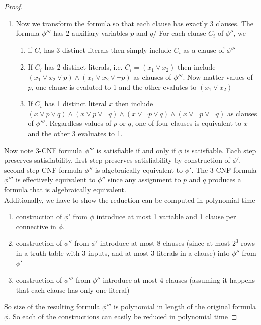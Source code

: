 \documentclass[11pt]{article}
\begin{document}
\begin{theorem*}
\begin{enumerate}
\begin{proof}
\begin{enumerate}
                \item Now we transform the formula so that each clause has exactly 3 clauses. The formula $\phi'''$ has 2 auxiliary variables $p$ and $q$/ For each cluase $C_i$ of $\phi''$, we 
                \begin{enumerate}
                    \item if $C_i$ has 3 distinct literals then simply include $C_i$ as a clause of $\phi'''$
                    \item If $C_i$ has 2 distinct literals, i.e. $C_i = (x_1 \lor x_2)$ then include $(x_1 \lor x_2 \lor p) \land (x_1\lor x_2 \lor \neg p)$ as clauses of $\phi'''$. Now matter values of $p$, one clause is evaluted to 1 and the other evalutes to $(x_1 \lor x_2)$
                    \item If $C_i$ has 1 distinct literal $x$ then include $(x \lor p \lor q) \land (x \lor p \lor \neg q) \land (x \lor \neg p \lor q ) \land (x\lor \neg p \lor \neg q)$ as clauses of $\phi'''$. Regardless values of $p$ or $q$, one of four clauses is equivalent to $x$ and the other 3 evaluates to 1.
                \end{enumerate}
            \end{enumerate}
            Now note 3-CNF formula $\phi'''$ is satisfiable if and only if $\phi$ is satisfiable. Each step preserves satisfiability. first step preserves satisfiability by construction of $\phi'$. second step CNF formula $\phi''$ is algebraically equivalent to $\phi'$. The 3-CNF formula $\phi'''$ is effectively equivalent to $\phi''$ since any assignment to $p$ and $q$ produces a formula that is algebraically equivalent.\\
            Additionally, we have to show the reduction can be computed in polynomial time 
            \begin{enumerate}
                \item construction of $\phi'$ from $\phi$ introduce at most 1 variable and 1 clause per connective in $\phi$. 
                \item construction of $\phi''$ from $\phi'$ introduce at most 8 clauses (since at most $2^3$ rows in a truth table with 3 inputs, and at most 3 literals in a clause) into $\phi''$ from $\phi'$
                \item construction of $\phi'''$ from $\phi''$ introduce at most 4 clauses (assuming it happens that each clause has only one literal) 
            \end{enumerate}
            So size of the resulting formula $\phi'''$ is polynomial in length of the original formula $\phi$. So each of the constructions can easily be reduced in polynomial time
        \end{proof}
    \end{enumerate}
\end{theorem*}
\end{document}
